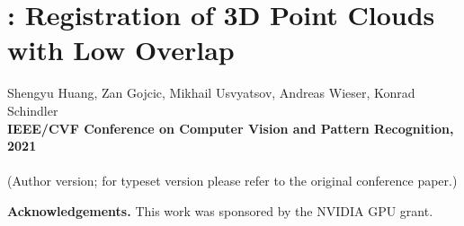 \chapter[\acro: Registration of 3D Point Clouds with Low Overlap]{\acro: Registration of 3D Point Clouds with Low Overlap}
\label{chap:cvpr21}

Shengyu Huang, Zan Gojcic, Mikhail Usvyatsov, Andreas Wieser, Konrad Schindler\\
\textbf{IEEE/CVF Conference on Computer Vision and Pattern Recognition, 2021}\\
\\
(Author version; for typeset version please refer to the original conference paper.)\\

\providecommand{\subdir}{.}
\graphicspath{{\subdir/}}


\newpage






\newpage


\noindent\textbf{Acknowledgements.}
{This work was sponsored by the NVIDIA GPU grant.}
